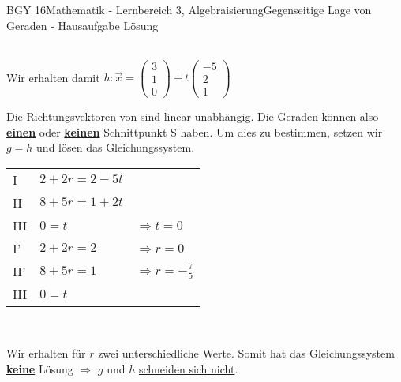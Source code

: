 \documentclass[oneside,openany,headings=optiontotoc,11pt,numbers=noenddot]{scrreprt}
\begin{document}
\begin{worksheet}{BGY 16}{Mathematik - Lernbereich 3, Algebraisierung}{Gegenseitige Lage von Geraden - Hausaufgabe Lösung}
\begin{framed}
			\normalsize\\
			Wir erhalten damit \(h: \vec{x} = \left(\begin{array}{c}3\\1\\0\end{array}\right) + t\left(\begin{array}{c}-5\\2\\1\end{array}\right)\)\\
			\par\noindent
			Die Richtungsvektoren von sind \color{blue}linear unabhängig\normalcolor. Die Geraden können also \textbf{\underline{einen}} oder \textbf{\underline{keinen}} Schnittpunkt S haben. Um dies zu bestimmen, setzen wir \(g=h\) und lösen das Gleichungssystem.\\
			\begin{center}
				\begin{tabular}{lll}
					I & \(2 + 2r = 2 -5t\)\\
					II & \(8 +5r = 1 + 2t\) \\
					III & \(0 = t\) & \(\Rightarrow t = 0\)\\
					\hline 
					I' & \(2 + 2r = 2\) & \(\Rightarrow r = 0\)\\
					II' & \(8+5r = 1\) & \(\Rightarrow r = -\frac{7}{5}\)\\
					III & \( 0 = t\)
				\end{tabular}\\
			\end{center}
			Wir erhalten für \(r\) zwei unterschiedliche Werte. Somit hat das Gleichungssystem \textbf{\underline{keine}} Lösung \( \Rightarrow \) \(g\) und \(h\) \color{red}\underline{schneiden sich nicht}\normalcolor.
		\end{framed}
	\end{worksheet}
\end{document}
